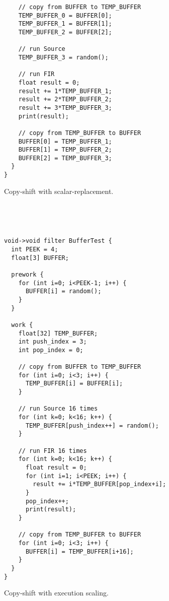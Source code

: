 \begin{figure*}
\begin{minipage}[t]{2in}
{\begin{verbatim}
    // copy from BUFFER to TEMP_BUFFER
    TEMP_BUFFER_0 = BUFFER[0];
    TEMP_BUFFER_1 = BUFFER[1];
    TEMP_BUFFER_2 = BUFFER[2];

    // run Source
    TEMP_BUFFER_3 = random();
    
    // run FIR
    float result = 0;
    result += 1*TEMP_BUFFER_1;
    result += 2*TEMP_BUFFER_2;
    result += 3*TEMP_BUFFER_3;
    print(result);

    // copy from TEMP_BUFFER to BUFFER
    BUFFER[0] = TEMP_BUFFER_1;
    BUFFER[1] = TEMP_BUFFER_2;
    BUFFER[2] = TEMP_BUFFER_3;
  }
}
\end{verbatim}}

\caption{Copy-shift with scalar-replacement.\protect\label{fig:code-scalar-replace}}
\end{minipage}
~~\vrule~~
\begin{minipage}[t]{2.1in}
{\scriptsize
\begin{verbatim}


void->void filter BufferTest {
  int PEEK = 4;
  float[3] BUFFER;

  prework {
    for (int i=0; i<PEEK-1; i++) {
      BUFFER[i] = random();
    }
  }

  work {
    float[32] TEMP_BUFFER;
    int push_index = 3;
    int pop_index = 0;

    // copy from BUFFER to TEMP_BUFFER
    for (int i=0; i<3; i++) {
      TEMP_BUFFER[i] = BUFFER[i];
    }

    // run Source 16 times
    for (int k=0; k<16; k++) {
      TEMP_BUFFER[push_index++] = random();
    }
    
    // run FIR 16 times
    for (int k=0; k<16; k++) {
      float result = 0;
      for (int i=1; i<PEEK; i++) {
        result += i*TEMP_BUFFER[pop_index+i];
      }
      pop_index++;
      print(result);
    }
      
    // copy from TEMP_BUFFER to BUFFER
    for (int i=0; i<3; i++) {
      BUFFER[i] = TEMP_BUFFER[i+16];
    }
  }
}
\end{verbatim}}

\caption{Copy-shift with execution scaling.\protect\label{fig:code-scaling}}
\end{minipage}
\end{figure*}
